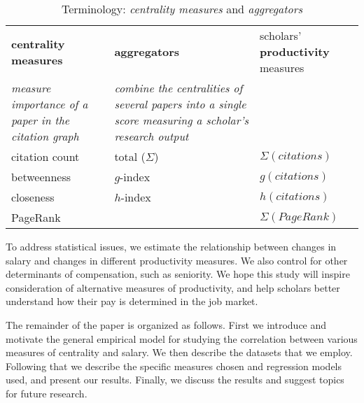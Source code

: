 \begin{table}[h]
	\centering
	\label{tableTerminology}
	\caption{Terminology: \emph{centrality measures} and \emph{aggregators}}
	
	\begin{tabular} {p{2.5cm}|p{2.5cm}||p{2cm}}
		\textbf{centrality measures}& \textbf{aggregators} & scholars' \textbf{productivity} measures \\
		 \textit{\footnotesize measure importance of a paper in the citation graph} &
		 \textit{\footnotesize combine the centralities of several papers into a single score measuring a scholar's research output}
		 & \\ \hline
		citation count & total ($\Sigma$) & $\Sigma(citations)$ \\
		betweenness & $g$-index & $g(citations)$ \\
		closeness & $h$-index & $h(citations)$ \\
		PageRank &  & $\Sigma(PageRank)$
	\end{tabular}
\end{table}

To address statistical issues, we estimate the relationship between changes in salary and changes in different productivity measures. We also control for other determinants of compensation, such as seniority. We hope this study will inspire consideration of alternative measures of productivity, and help scholars better understand how their pay is determined in the job market.

The remainder of the paper is organized as follows. First we introduce and motivate the general empirical model for studying the correlation between various measures of centrality and salary. We then describe the datasets that we employ. Following that we describe the specific measures chosen and regression models used, and present our results. Finally, we discuss the results and suggest topics for future research.
